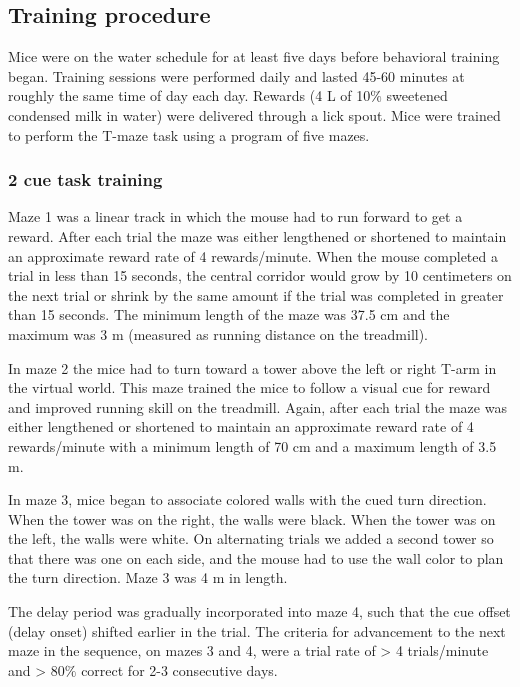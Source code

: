 \subsection{Training procedure} 
Mice were on the water schedule for at least five days before behavioral training began. Training sessions were performed daily and lasted 45-60 minutes at roughly the same time of day each day. Rewards (4 L of 10$\%$ sweetened condensed milk in water) were delivered through a lick spout. Mice were trained to perform the T-maze task using a program of five mazes. 

\bigskip

\subsubsection{2 cue task training}
Maze 1 was a linear track in which the mouse had to run forward to get a reward.  After each trial the maze was either lengthened or shortened to maintain an approximate reward rate of 4 rewards/minute. When the mouse completed a trial in less than 15 seconds, the central corridor would grow by 10 centimeters on the next trial or shrink by the same amount if the trial was completed in greater than 15 seconds. The minimum length of the maze was 37.5 cm and the maximum was 3 m (measured as running distance on the treadmill). 

\bigskip

In maze 2 the mice had to turn toward a tower above the left or right T-arm in the virtual world. This maze trained the mice to follow a visual cue for reward and improved running skill on the treadmill. Again, after each trial the maze was either lengthened or shortened to maintain an approximate reward rate of 4 rewards/minute with a minimum length of 70 cm and a maximum length of 3.5 m. 

\bigskip

In maze 3, mice began to associate colored walls with the cued turn direction. When the tower was on the right, the walls were black. When the tower was on the left, the walls were white. On alternating trials we added a second tower so that there was one on each side, and the mouse had to use the wall color to plan the turn direction. Maze 3 was 4 m in length. 

\bigskip

The delay period was gradually incorporated into maze 4, such that the cue offset (delay onset) shifted earlier in the trial. The criteria for advancement to the next maze in the sequence, on mazes 3 and 4, were a trial rate of > 4 trials/minute and > 80$\%$ correct for 2-3 consecutive days. 

